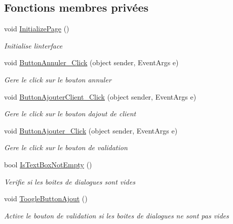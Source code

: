\subsection*{Fonctions membres privées}
\begin{DoxyCompactItemize}
\item 
void \mbox{\hyperlink{class_m_t_connect_agent_1_1_form_modifie_machine_a9992bca1ff188361f676db535a527a21}{Initialize\+Page}} ()
\begin{DoxyCompactList}\small\item\em Initialise l\textquotesingle{}interface \end{DoxyCompactList}\item 
void \mbox{\hyperlink{class_m_t_connect_agent_1_1_form_modifie_machine_a20ee7087b2ef87582c8c04710d91345e}{Button\+Annuler\+\_\+\+Click}} (object sender, Event\+Args e)
\begin{DoxyCompactList}\small\item\em Gere le click sur le bouton annuler \end{DoxyCompactList}\item 
void \mbox{\hyperlink{class_m_t_connect_agent_1_1_form_modifie_machine_a577d92583c806bbca8bbb25176357bd8}{Button\+Ajouter\+Client\+\_\+\+Click}} (object sender, Event\+Args e)
\begin{DoxyCompactList}\small\item\em Gere le click sur le bouton d\textquotesingle{}ajout de client \end{DoxyCompactList}\item 
void \mbox{\hyperlink{class_m_t_connect_agent_1_1_form_modifie_machine_a6e51e76ab8b6b3011df81c75aef5db2c}{Button\+Ajouter\+\_\+\+Click}} (object sender, Event\+Args e)
\begin{DoxyCompactList}\small\item\em Gere le click sur le bouton de validation \end{DoxyCompactList}\item 
bool \mbox{\hyperlink{class_m_t_connect_agent_1_1_form_modifie_machine_a4d4c196d4f478707dfd898c495e15c3f}{Is\+Text\+Box\+Not\+Empty}} ()
\begin{DoxyCompactList}\small\item\em Verifie si les boites de dialogues sont vides \end{DoxyCompactList}\item 
void \mbox{\hyperlink{class_m_t_connect_agent_1_1_form_modifie_machine_a01cf5ac4fe8cf70b7145a8be2b9d4d60}{Toogle\+Button\+Ajout}} ()
\begin{DoxyCompactList}\small\item\em Active le bouton de validation si les boites de dialogues ne sont pas vides \end{DoxyCompactList}\item 

\end{DoxyCompactItemize}
